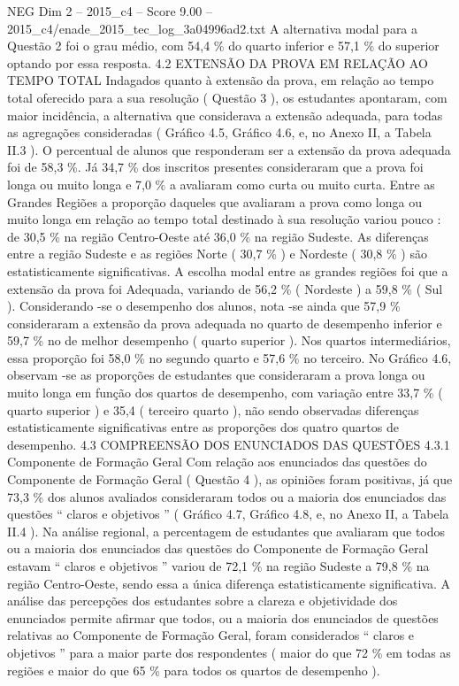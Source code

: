\begin{textsample}{NEG Dim 2 – 2015\_c4 – Score 9.00 – 2015\_c4/enade\_2015\_tec\_log\_3a04996ad2.txt}
A alternativa modal para a Questão 2 foi o grau médio, com 54,4 \% do quarto inferior e 57,1 \% do superior optando por essa resposta. 4.2 EXTENSÃO DA PROVA EM RELAÇÃO AO TEMPO TOTAL Indagados quanto à extensão da prova, em relação ao tempo total oferecido para a sua resolução ( Questão 3 ), os estudantes apontaram, com maior incidência, a alternativa que considerava a extensão adequada, para todas as agregações consideradas ( Gráfico 4.5, Gráfico 4.6, e, no Anexo II, a Tabela II.3 ).
O percentual de alunos que responderam ser a extensão da prova adequada foi de 58,3 \%.
Já 34,7 \% dos inscritos presentes consideraram que a prova foi longa ou muito longa e 7,0 \% a avaliaram como curta ou muito curta.
Entre as Grandes Regiões a proporção daqueles que avaliaram a prova como longa ou muito longa em relação ao tempo total destinado à sua resolução variou pouco : de 30,5 \% na região Centro-Oeste até 36,0 \% na região Sudeste.
As diferenças entre a região Sudeste e as regiões Norte ( 30,7 \% ) e Nordeste ( 30,8 \% ) são estatisticamente significativas.
A escolha modal entre as grandes regiões foi que a extensão da prova foi Adequada, variando de 56,2 \% ( Nordeste ) a 59,8 \% ( Sul ).
Considerando -se o desempenho dos alunos, nota -se ainda que 57,9 \% consideraram a extensão da prova adequada no quarto de desempenho inferior e 59,7 \% no de melhor desempenho ( quarto superior ).
Nos quartos intermediários, essa proporção foi 58,0 \% no segundo quarto e 57,6 \% no terceiro.
No Gráfico 4.6, observam -se as proporções de estudantes que consideraram a prova longa ou muito longa em função dos quartos de desempenho, com variação entre 33,7 \% ( quarto superior ) e 35,4 ( terceiro quarto ), não sendo observadas diferenças estatisticamente significativas entre as proporções dos quatro quartos de desempenho. 4.3 COMPREENSÃO DOS ENUNCIADOS DAS QUESTÕES 4.3.1 Componente de Formação Geral Com relação aos enunciados das questões do Componente de Formação Geral ( Questão 4 ), as opiniões foram positivas, já que 73,3 \% dos alunos avaliados consideraram todos ou a maioria dos enunciados das questões “ claros e objetivos ” ( Gráfico 4.7, Gráfico 4.8, e, no Anexo II, a Tabela II.4 ).
Na análise regional, a percentagem de estudantes que avaliaram que todos ou a maioria dos enunciados das questões do Componente de Formação Geral estavam “ claros e objetivos ” variou de 72,1 \% na região Sudeste a 79,8 \% na região Centro-Oeste, sendo essa a única diferença estatisticamente significativa.
A análise das percepções dos estudantes sobre a clareza e objetividade dos enunciados permite afirmar que todos, ou a maioria dos enunciados de questões relativas ao Componente de Formação Geral, foram considerados “ claros e objetivos ” para a maior parte dos respondentes ( maior do que 72 \% em todas as regiões e maior do que 65 \% para todos os quartos de desempenho ).

\end{textsample}

